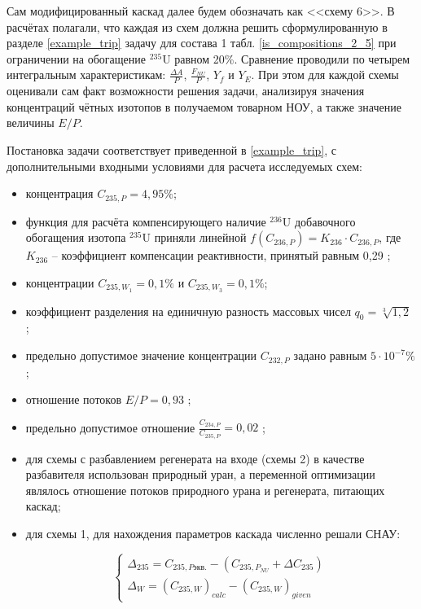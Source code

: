 Сам модифицированный каскад далее будем обозначать как <<схему 6>>. В расчётах полагали, что каждая из схем должна решить сформулированную в разделе \ref{example_trip} задачу для состава 1 табл. \ref{is_compositions_2_5} при ограничении на обогащение $^{235}$U равном 20\%. Сравнение проводили по четырем интегральным характеристикам: $\frac{\Delta A}{P}$, $\frac{F_{NU}}{P}$, $Y_f$ и $Y_E$. При этом для каждой схемы оценивали сам факт возможности решения задачи, анализируя значения концентраций чётных изотопов в получаемом товарном НОУ, а также значение величины $E/P$. 

Постановка задачи соответствует приведенной в \ref{example_trip}, с дополнительными входными условиями для расчета исследуемых схем:

\begin{itemize}
    \item концентрация $C_{235,{P}} = {4,95\%}$; 
    \item функция для расчёта компенсирующего наличие $^{236}$U добавочного обогащения изотопа $^{235}$U приняли линейной $f(C_{236,P}) = {K_{236}\cdot{C_{236,{P}}}}$, где $K_{236}$ -- коэффициент компенсации реактивности, принятый равным 0,29 \cite{smirnovEvolutionIsotopicComposition2012};
    \item концентрации $C_{235,{W_1}} = 0,1\%$ и $C_{235,{W_3}} = 0,1\%$;
    \item коэффициент разделения на единичную разность массовых чисел $q_{0} = \sqrt[3]{1,2}$ \cite{smirnovEvolutionIsotopicComposition2012};
    \item предельно допустимое значение концентрации $C_{232,{P}}$ задано равным $5\cdot10^{-7} \%$;
    \item отношение потоков $E/P = 0,93$ \cite{smirnovObogashchenieRegenerirovannogoUrana2018};
    \item предельно допустимое отношение $\frac{C_{234,{P}}}{C_{235,{P}}} = 0,02$ \cite{smirnovObogashchenieRegenerirovannogoUrana2018};
    \item для схемы с разбавлением регенерата на входе (схемы 2) в качестве разбавителя использован природный уран, а переменной оптимизации являлось отношение потоков природного урана и регенерата, питающих каскад;
    \item для схемы 1, для нахождения параметров каскада численно решали СНАУ:
    
    \begin{equation}\label{snau_sch1}
  \begin{cases}
  \Delta_{235}=C_{235,P\textit{экв.}}-(C_{235,{P_{NU}}}+\Delta C_{235})\\
  \Delta_{W} = {(C_{235, W})}_{calc}-{(C_{235, W})}_{given}
  \end{cases}\,
\end{equation}
    

\end{itemize}
